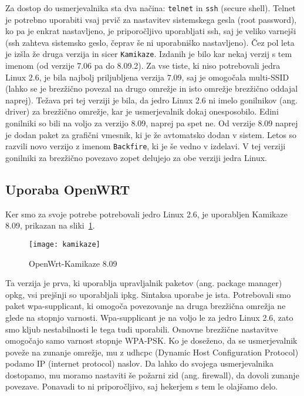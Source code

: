 \documentclass[a4paper, 12pt]{book}
\begin{document}
Za dostop do usmerjevalnika sta dva načina: {\tt telnet} in {\tt ssh} (secure shell). Telnet je potrebno uporabiti vsaj prvič za nastavitev sistemskega gesla (root password), ko pa je enkrat nastavljeno, je priporočljivo uporabljati ssh, saj je veliko varnejši (ssh zahteva sistemsko geslo, čeprav še ni uporabniško nastavljeno). Čez pol leta je izšla že druga verzija in sicer {\tt Kamikaze}. Izdanih je bilo kar nekaj verzij s tem imenom (od verzije 7.06 pa do 8.09.2). Za vse tiste, ki niso potrebovali jedra Linux 2.6, je bila najbolj priljubljena verzija 7.09, saj je omogočala multi-SSID (lahko se je brezžično povezal na drugo omrežje in isto omrežje brezžično oddajal naprej). Težava pri tej verziji je bila, da jedro Linux 2.6 ni imelo gonilnikov (ang. driver) za brezžično omrežje, kar je usmerjevalnik dokaj onesposobilo. Edini gonilniki so bili na voljo za verzijo 8.09, naprej pa spet ne. Od verzije 8.09 naprej je dodan paket za grafični vmesnik, ki je že avtomatsko dodan v sistem. Letos so razvili novo verzijo z imenom {\tt Backfire}, ki je še vedno v izdelavi. V tej verziji gonilniki za brezžično povezavo zopet delujejo za obe verziji jedra Linux. 
\subsection{Uporaba OpenWRT}
Ker smo za svoje potrebe potrebovali jedro Linux 2.6, je uporabljen Kamikaze 8.09, prikazan na sliki~\ref{picKamikaze}.

\begin{figure}[h]
	\centering
	\texttt{[image: kamikaze]}
	\caption{OpenWrt-Kamikaze 8.09}
	\label{picKamikaze}
\end{figure}

Ta verzija je prva, ki uporablja upravljalnik paketov (ang. package manager) opkg, vsi prejšnji so uporabljali ipkg. Sintaksa uporabe je ista. Potrebovali smo paket wpa-supplicant, ki omogoča povezovanje na druga brezžična omrežja ne glede na stopnjo varnosti. Wpa-supplicant je na voljo le za jedro Linux 2.6, zato smo kljub nestabilnosti le tega tudi uporabili. Osnovne brezžične nastavitve omogočajo samo varnost stopnje WPA-PSK. Ko je  doseženo, da se  usmerjevalnik poveže na zunanje omrežje, mu z udhcpc (Dynamic Host Configuration Protocol) podamo IP (internet protocol) naslov. Da  lahko do svojega usmerjevalnika dostopamo, mu moramo nastaviti še požarni zid (ang. firewall), da dovoli zunanje povezave. Ponavadi to ni priporočljivo, saj hekerjem s tem le olajšamo delo.
\end{document}
